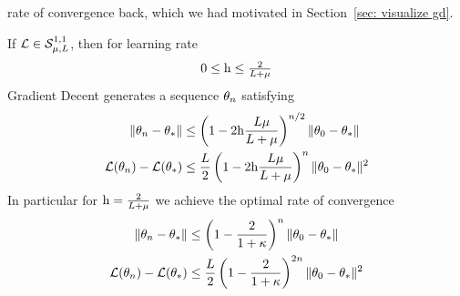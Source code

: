 rate of convergence back, which we had motivated in Section~\ref{sec: visualize gd}. 
%
\begin{theorem}
	If \(\mathcal{L}\in\mathcal{S}^{1,1}_{{\mu},{L}}\), then for learning rate
	\[0 \le \text{h} \le \tfrac{2}{L+\mu}\]
	Gradient Decent generates a sequence \(\theta_n\) satisfying
	\begin{subequations}
	\begin{align}
		\label{eq: gd strong convexity convergence rate 1}
		\|\theta_n - \theta_*\|
		&\le \left(
			1- 2\text{h}\frac{L\mu}{L+\mu}
		\right)^{n/2}
		\|\theta_0 - \theta_*\| \\
		\label{eq: gd strong convexity convergence rate 2}
		\mathcal{L}(\theta_n) - \mathcal{L}(\theta_*)
		&\le \frac{L}{2} \left(
			1- 2\text{h}\frac{L\mu}{L+\mu}
		\right)^{n}
		\|\theta_0 - \theta_*\|^2
	\end{align}
	\end{subequations}
	In particular for \(\text{h}=\tfrac2{L+\mu}\) we achieve the optimal
	rate of convergence
	\begin{subequations}\label{eq: gd strong convexity optimal rate}
	\begin{align}
		\|\theta_n - \theta_*\|
		&\le \left(
			1- \frac{2}{1+\kappa}
		\right)^n
		\|\theta_0 - \theta_*\| \\
		\mathcal{L}(\theta_n) - \mathcal{L}(\theta_*)
		&\le \frac{L}{2} \left(
			1- \frac{2}{1+\kappa}
		\right)^{2n}
		\|\theta_0 - \theta_*\|^2
	\end{align}
	\end{subequations}
\end{theorem}
